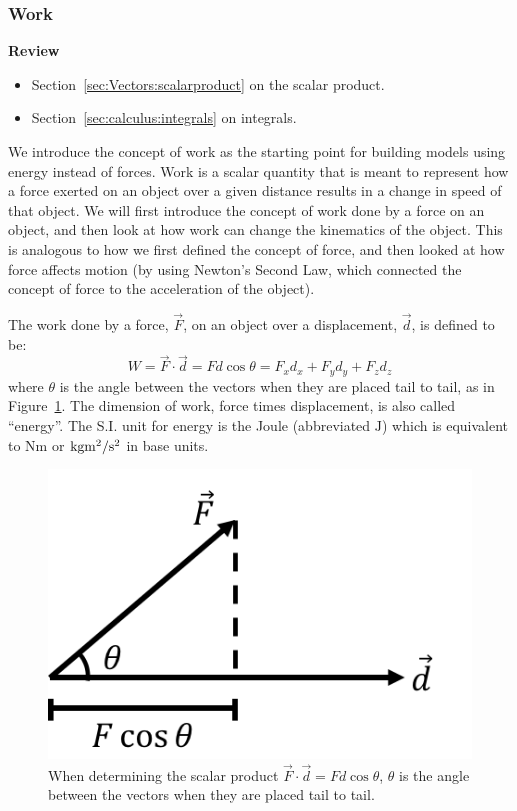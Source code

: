 \subsubsection{Work}

\begin{framed}
\textbf{Review}\\
\begin{itemize}
\item Section~\ref{sec:Vectors:scalarproduct} on the scalar product.
\item Section~\ref{sec:calculus:integrals} on integrals.
\end{itemize}
\end{framed}

We introduce the concept of work as the starting point for building models using energy instead of forces. Work is a scalar quantity that is meant to represent how a force exerted on an object over a given distance results in a change in speed of that object. We will first introduce the concept of work done by a force on an object, and then look at how work can change the kinematics of the object. This is analogous to how we first defined the concept of force, and then looked at how force affects motion (by using Newton's Second Law, which connected the concept of force to the acceleration of the object).

The work done by a force, $\vec F$, on an object over a displacement, $\vec d$, is defined to be:
\begin{equation}
\boxed{W = \vec F \cdot \vec d = Fd\cos\theta = F_xd_x+F_yd_y+F_zd_z}
\end{equation}
where $\theta$ is the angle between the vectors when they are placed tail to tail, as in Figure~\ref{fig:workenergy:fddotproduct}. The dimension of work, force times displacement, is also called ``energy''. The S.I. unit for energy is the Joule (abbreviated $\text{J}$) which is equivalent to $\text{Nm}$ or ${\rm kg m^2/s^2}$ in base units.

\begin{figure}[!htbp]
\centering
\includegraphics[width=0.3\linewidth]{files/fddotproduct-49904090da9ae6fe24ebcc94657f47b1.png}
\caption[]{When determining the scalar product $\vec F\cdot \vec d = Fd\cos\theta$, $\theta$ is the angle between the vectors when they are placed tail to tail.}
\label{fig:workenergy:fddotproduct}
\end{figure}

